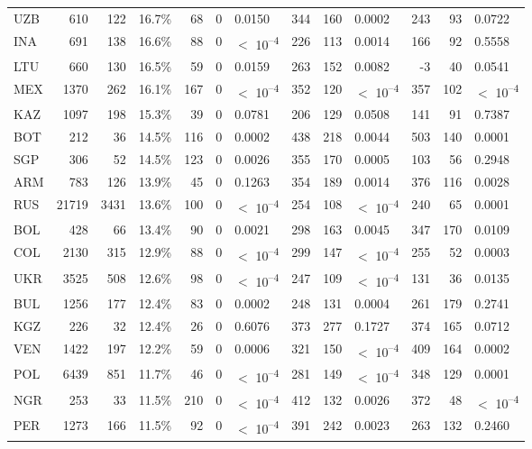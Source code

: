 \begin{tabular}[t]{lrrlrrlrrlrrl}
UZB & 610 & 122 & 16.7\% & 68 & 0 & 0.0150 & 344 & 160 & 0.0002 & 243 & 93 & 0.0722\\
INA & 691 & 138 & 16.6\% & 88 & 0 & $<$ 10\textsuperscript{--4} & 226 & 113 & 0.0014 & 166 & 92 & 0.5558\\
LTU & 660 & 130 & 16.5\% & 59 & 0 & 0.0159 & 263 & 152 & 0.0082 & -3 & 40 & 0.0541\\
MEX & 1370 & 262 & 16.1\% & 167 & 0 & $<$ 10\textsuperscript{--4} & 352 & 120 & $<$ 10\textsuperscript{--4} & 357 & 102 & $<$ 10\textsuperscript{--4}\\
KAZ & 1097 & 198 & 15.3\% & 39 & 0 & 0.0781 & 206 & 129 & 0.0508 & 141 & 91 & 0.7387\\
BOT & 212 & 36 & 14.5\% & 116 & 0 & 0.0002 & 438 & 218 & 0.0044 & 503 & 140 & 0.0001\\
SGP & 306 & 52 & 14.5\% & 123 & 0 & 0.0026 & 355 & 170 & 0.0005 & 103 & 56 & 0.2948\\
ARM & 783 & 126 & 13.9\% & 45 & 0 & 0.1263 & 354 & 189 & 0.0014 & 376 & 116 & 0.0028\\
RUS & 21719 & 3431 & 13.6\% & 100 & 0 & $<$ 10\textsuperscript{--4} & 254 & 108 & $<$ 10\textsuperscript{--4} & 240 & 65 & 0.0001\\
BOL & 428 & 66 & 13.4\% & 90 & 0 & 0.0021 & 298 & 163 & 0.0045 & 347 & 170 & 0.0109\\
COL & 2130 & 315 & 12.9\% & 88 & 0 & $<$ 10\textsuperscript{--4} & 299 & 147 & $<$ 10\textsuperscript{--4} & 255 & 52 & 0.0003\\
UKR & 3525 & 508 & 12.6\% & 98 & 0 & $<$ 10\textsuperscript{--4} & 247 & 109 & $<$ 10\textsuperscript{--4} & 131 & 36 & 0.0135\\
BUL & 1256 & 177 & 12.4\% & 83 & 0 & 0.0002 & 248 & 131 & 0.0004 & 261 & 179 & 0.2741\\
KGZ & 226 & 32 & 12.4\% & 26 & 0 & 0.6076 & 373 & 277 & 0.1727 & 374 & 165 & 0.0712\\
VEN & 1422 & 197 & 12.2\% & 59 & 0 & 0.0006 & 321 & 150 & $<$ 10\textsuperscript{--4} & 409 & 164 & 0.0002\\
POL & 6439 & 851 & 11.7\% & 46 & 0 & $<$ 10\textsuperscript{--4} & 281 & 149 & $<$ 10\textsuperscript{--4} & 348 & 129 & 0.0001\\
NGR & 253 & 33 & 11.5\% & 210 & 0 & $<$ 10\textsuperscript{--4} & 412 & 132 & 0.0026 & 372 & 48 & $<$ 10\textsuperscript{--4}\\
PER & 1273 & 166 & 11.5\% & 92 & 0 & $<$ 10\textsuperscript{--4} & 391 & 242 & 0.0023 & 263 & 132 & 0.2460\\

\end{tabular}
